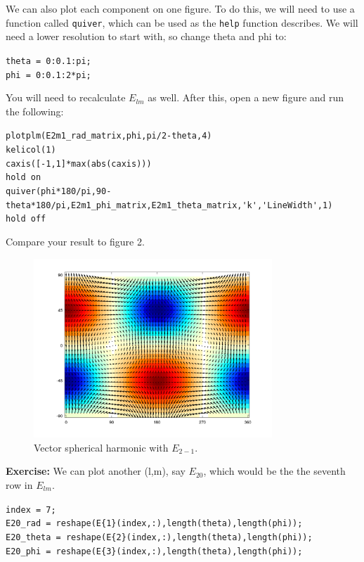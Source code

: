 \documentclass[11pt]{article}
\begin{document}
We can also plot each component on one figure.  To do this, we will need to use a function called \verb|quiver|, which can be used as the \verb|help| function describes.  We will need a lower resolution to start with, so change theta and phi to:

\verb|theta = 0:0.1:pi;|\\
\verb|phi = 0:0.1:2*pi;|

You will need to recalculate $E_{lm}$ as well.  After this, open a new figure and run the following:

\verb|plotplm(E2m1_rad_matrix,phi,pi/2-theta,4)|\\
\verb|kelicol(1)|\\
\verb|caxis([-1,1]*max(abs(caxis)))|\\
\verb|hold on|\\
\verb|quiver(phi*180/pi,90-theta*180/pi,E2m1_phi_matrix,E2m1_theta_matrix,'k','LineWidth',1)|\\
\verb|hold off|

Compare your result to figure 2.

\begin{figure}[H]
  \centering
  \includegraphics[width=0.8\textwidth]{figures_Rep2/E2m1_quiver.png}  
  \caption{Vector spherical harmonic with $E_{2-1}$.}
\label{E6_quiver}
\end{figure}

\textbf{Exercise:} We can plot another (l,m), say $E_{20}$, which would be the the seventh row in $E_{lm}$.  

\verb|index = 7;|\\
\verb|E20_rad = reshape(E{1}(index,:),length(theta),length(phi));|\\
\verb|E20_theta = reshape(E{2}(index,:),length(theta),length(phi));|\\
\verb|E20_phi = reshape(E{3}(index,:),length(theta),length(phi));|
\end{document}
